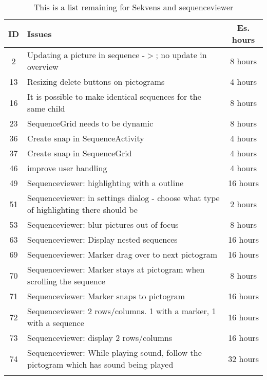 \begin{longtable} { | c | p{12cm} | c | } 
\hline
	ID 	&	Issues	&	 Es. hours \\\hline
	2	& 	Updating a picture in sequence -$>$; no update in overview	& 	8 hours  \\\hline
	13	& 	Resizing delete buttons on pictograms	& 	4 hours  \\\hline
	16	& 	It is possible to make identical sequences for the same child	& 	8 hours  \\\hline
	23	& 	SequenceGrid needs to be dynamic	& 	8 hours  \\\hline
	36	& 	Create snap in SequenceActivity	& 	4 hours  \\\hline
	37	& 	Create snap in SequenceGrid	& 	4 hours  \\\hline
	46	& 	improve user handling 	& 	4 hours  \\\hline
	49	& 	Sequenceviewer: highlighting with a outline 	& 	16 hours  \\\hline
	51	& 	Sequenceviewer: in settings dialog - choose what type of highlighting there should be	& 	2 hours  \\\hline
	53	& 	Sequenceviewer: blur pictures out of focus	& 	8 hours  \\\hline
	63	& 	Sequenceviewer: Display nested sequences 	& 	16 hours  \\\hline
	69	& 	Sequenceviewer: Marker drag over to next pictogram 	& 	16 hours  \\\hline
	70	& 	Sequenceviewer: Marker stays at pictogram when scrolling the sequence 	& 	8 hours  \\\hline
	71	& 	Sequenceviewer: Marker snaps to pictogram 	& 	16 hours  \\\hline
	72	& 	Sequenceviewer: 2 rows/columns. 1 with a marker, 1 with a sequence 	& 	16 hours  \\\hline
	73	& 	Sequenceviewer: display 2 rows/columns 	& 	16 hours  \\\hline
	74	& 	Sequenceviewer: While playing sound, follow the pictogram which has sound being played 	& 	32 hours  \\\hline
\caption{This is a list remaining for Sekvens and sequenceviewer}
\label{tab:spr4_sw_prodblog}
\end{longtable}


